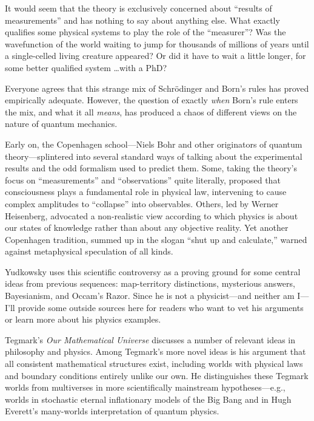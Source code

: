 {
 It would seem that the theory is exclusively concerned about
``results of measurements'' and has
nothing to say about anything else. What exactly qualifies some
physical systems to play the role of the
``measurer''? Was the wavefunction
of the world waiting to jump for thousands of millions of years until a
single-celled living creature appeared? Or did it have to wait a little
longer, for some better qualified system \ldots with a PhD?}

{
 Everyone agrees that this strange mix of Schrödinger and
Born's rules has proved empirically adequate. However,
the question of exactly \textit{when} Born's rule
enters the mix, and what it all \textit{means}, has produced a chaos of
different views on the nature of quantum mechanics.}

{
 Early on, the Copenhagen school---Niels Bohr and other originators
of quantum theory---splintered into several standard ways of talking
about the experimental results and the odd formalism used to predict
them. Some, taking the theory's focus on
``measurements'' and
``observations'' quite literally,
proposed that consciousness plays a fundamental role in physical law,
intervening to cause complex amplitudes to
``collapse'' into observables.
Others, led by Werner Heisenberg, advocated a non-realistic view
according to which physics is about our states of knowledge rather than
about any objective reality. Yet another Copenhagen tradition, summed
up in the slogan ``shut up and
calculate,'' warned against metaphysical speculation
of all kinds.}

{
 Yudkowsky uses this scientific controversy as a proving ground for
some central ideas from previous sequences: map-territory distinctions,
mysterious answers, Bayesianism, and Occam's Razor.
Since he is not a physicist---and neither am I---I'll
provide some outside sources here for readers who want to vet his
arguments or learn more about his physics examples.}

{
 Tegmark's \textit{Our Mathematical Universe}
discusses a number of relevant ideas in philosophy and
physics. Among Tegmark's more novel
ideas is his argument that all consistent mathematical structures
exist, including worlds with physical laws and boundary conditions
entirely unlike our own. He distinguishes these Tegmark worlds from
multiverses in more scientifically mainstream hypotheses---e.g., worlds
in stochastic eternal inflationary models of the Big Bang and in Hugh
Everett's many-worlds interpretation of quantum
physics.}

